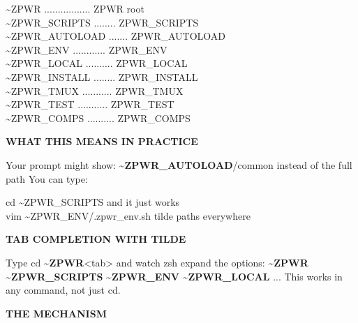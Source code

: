 \documentclass[11pt,a4paper,twoside]{book}
\begin{document}
\begin{codebox}
\color{neongreen}\textasciitilde{}ZPWR ................. ZPWR root\\
\color{neongreen}\textasciitilde{}ZPWR\_SCRIPTS ........ ZPWR\_SCRIPTS\\
\color{neongreen}\textasciitilde{}ZPWR\_AUTOLOAD ....... ZPWR\_AUTOLOAD\\
\color{neongreen}\textasciitilde{}ZPWR\_ENV ............ ZPWR\_ENV\\
\color{neongreen}\textasciitilde{}ZPWR\_LOCAL .......... ZPWR\_LOCAL\\
\color{neongreen}\textasciitilde{}ZPWR\_INSTALL ........ ZPWR\_INSTALL\\
\color{neongreen}\textasciitilde{}ZPWR\_TMUX ........... ZPWR\_TMUX\\
\color{neongreen}\textasciitilde{}ZPWR\_TEST ........... ZPWR\_TEST\\
\color{neongreen}\textasciitilde{}ZPWR\_COMPS .......... ZPWR\_COMPS\\
\end{codebox}


\vspace{12pt}
{\bfseries\color{neonyellow} WHAT THIS MEANS IN PRACTICE}\vspace{4pt}

Your prompt might show: \textasciitilde{}\textbf{ZPWR\_AUTOLOAD}/common  instead of the full path You can type:

\begin{codebox}
\color{neongreen}cd \textasciitilde{}ZPWR\_SCRIPTS  and it just works\\
\color{neongreen}vim \textasciitilde{}ZPWR\_ENV/.zpwr\_env.sh  tilde paths everywhere\\
\end{codebox}


\vspace{12pt}
{\bfseries\color{neonyellow} TAB COMPLETION WITH TILDE}\vspace{4pt}

Type cd \textasciitilde{}\textbf{ZPWR}<tab> and watch zsh expand the options: \textasciitilde{}\textbf{ZPWR}  \textasciitilde{}\textbf{ZPWR\_SCRIPTS}  \textasciitilde{}\textbf{ZPWR\_ENV}  \textasciitilde{}\textbf{ZPWR\_LOCAL} ... This works in any command, not just cd.


\vspace{12pt}
{\bfseries\color{neonyellow} THE MECHANISM}\vspace{4pt}
\end{document}
